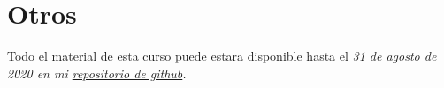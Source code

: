 \documentclass[12pt]{article}
\begin{document}
\begin{enumerate}[{\bf Sesi\'on} 1{.}]
\begin{enumerate}[{\bf Actividad} 1{.}]
			\end{enumerate}			
	\end{enumerate}

\section *{Otros}
	
	\par Todo el material de esta curso puede estara disponible hasta el \it{31 de agosto de 2020} en mi \href{https://github.com/BenchHPZ/CIVUL-UnADM.git}{repositorio de github}.
\end{document}
